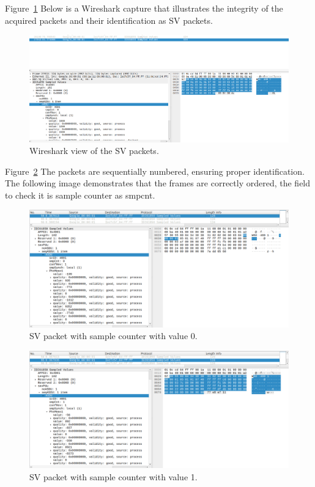 Figure~\ref{fig:simple_sv} Below is a Wireshark capture that illustrates the integrity of the acquired packets and their identification as SV packets.

\begin{figure}[tbh!]
	\centering
	\includegraphics[width=1.00\textwidth, keepaspectratio]{ch6/assets/simple_sv.png} %
	\caption{Wireshark view of the SV packets.}
	\label{fig:simple_sv}
\end{figure}

Figure~\ref{fig:sv_seq_1} The packets are sequentially numbered, ensuring proper identification. The following image demonstrates that the frames are correctly ordered, the field to check it is sample counter as smpcnt.

\begin{figure}[tbh!]
	\centering
	\includegraphics[width=1.00\textwidth, keepaspectratio]{ch6/assets/sv_seq_1.png} %
	\caption{SV packet with sample counter with value 0.}
	\label{fig:sv_seq_1}
\end{figure}

\begin{figure}[tbh!]
	\centering
	\includegraphics[width=1.00\textwidth, keepaspectratio]{ch6/assets/sv_seq_2.png} %
	\caption{SV packet with sample counter with value 1.}
	\label{fig:sv_seq_2}
\end{figure}


